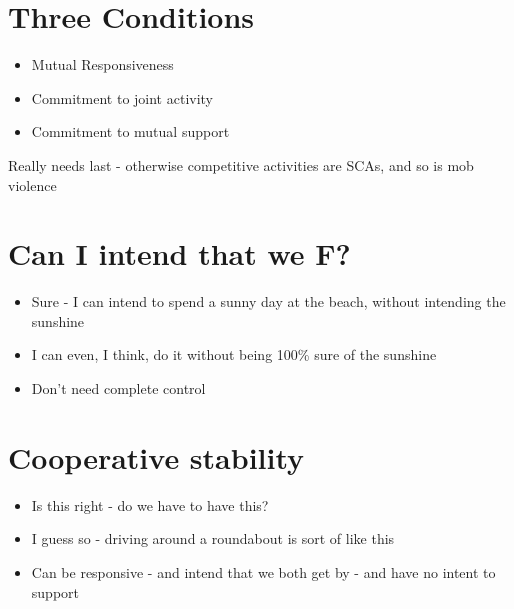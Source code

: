 
\def\mytitle{Notes to Self on Bratman}
\def\myauthor{Brian Weatherson}
\def\mydate{April 10, 2018}


\section{Three Conditions}
\label{threeconditions}

\begin{itemize}
\item{} Mutual Responsiveness

\item{} Commitment to joint activity

\item{} Commitment to mutual support

\end{itemize}
Really needs last - otherwise competitive activities are SCAs, and so is mob violence

\section{Can I intend that we F?}
\label{caniintendthatwef}

\begin{itemize}
\item{} Sure - I can intend to spend a sunny day at the beach, without intending the sunshine

\item{} I can even, I think, do it without being 100\% sure of the sunshine

\item{} Don't need complete control

\end{itemize}
\section{Cooperative stability}
\label{cooperativestability}

\begin{itemize}
\item{} Is this right - do we have to have this?

\item{} I guess so - driving around a roundabout is sort of like this

\item{} Can be responsive - and intend that we both get by - and have no intent to support

\end{itemize}
